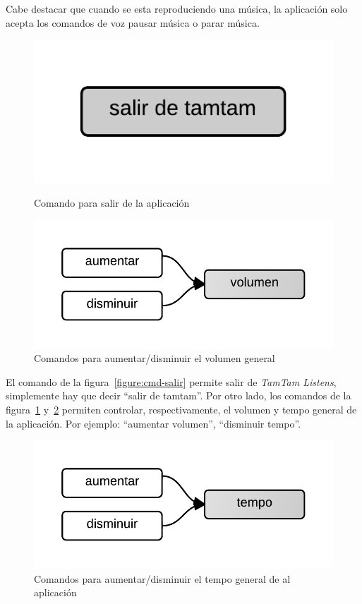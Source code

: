 Cabe destacar que cuando se esta reproduciendo una m\'usica, la aplicaci\'on solo acepta los comandos de
voz pausar m\'usica o parar m\'usica.


\begin{figure}[H]
\begin{minipage}[b]{0.5\linewidth}
\centering
\includegraphics[width=0.6\linewidth]{./graphics/salir.png}
\caption{Comando para salir de la aplicaci\'on}
\label{figure:cmd-salir}
\end{minipage}
\quad
\begin{minipage}[b]{0.5\linewidth}
\centering
\includegraphics[width=0.6\linewidth]{./graphics/cmd-vol.png}
\caption{Comandos para aumentar/disminuir el volumen general}
\label{figure:cmd-vol}
\end{minipage}
\end{figure}

El comando de la figura~\ref{figure:cmd-salir} permite salir de \emph{TamTam Listens}, simplemente hay que decir ``salir de tamtam''. Por otro lado, los comandos de la figura~\ref{figure:cmd-vol}
y~\ref{figure:cmd-tempo} permiten controlar, respectivamente, el volumen y tempo general de la aplicaci\'on. Por ejemplo: ``aumentar volumen'', ``disminuir tempo''.

\begin{figure}[H]
\begin{minipage}[b]{0.5\linewidth}
\centering
\includegraphics[width=0.6\linewidth]{./graphics/cmd-tempo.png}
\caption{Comandos para aumentar/disminuir el tempo general de al aplicaci\'on}
\label{figure:cmd-tempo}
\end{minipage}
\end{figure}

